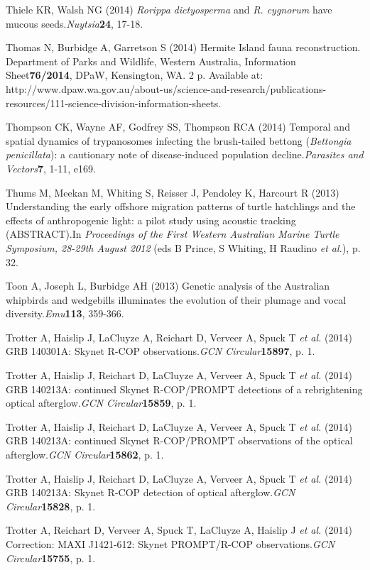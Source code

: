 \documentclass[version=last, paper=a4, DIV=18, usenames, dvipsnames]{scrartcl}
\begin{document}
Thiele KR, Walsh NG (2014) \emph{Rorippa} \emph{dictyosperma} and \emph{R. cygnorum} have mucous seeds.\emph{Nuytsia}\textbf{24}, 17-18.


Thomas N, Burbidge A, Garretson S (2014) Hermite Island fauna reconstruction. Department of Parks and Wildlife, Western Australia, Information Sheet\textbf{76/2014}, DPaW, Kensington, WA. 2 p. Available at: http://www.dpaw.wa.gov.au/about-us/science-and-research/publications-resources/111-science-division-information-sheets.


Thompson CK, Wayne AF, Godfrey SS, Thompson RCA (2014) Temporal and spatial dynamics of trypanosomes infecting the brush-tailed bettong (\emph{Bettongia} \emph{penicillata}): a cautionary note of disease-induced population decline.\emph{Parasites and Vectors}\textbf{7}, 1-11, e169.


Thums M, Meekan M, Whiting S, Reisser J, Pendoley K, Harcourt R (2013) Understanding the early offshore migration patterns of turtle hatchlings and the effects of anthropogenic light: a pilot study using acoustic tracking (ABSTRACT).In \emph{Proceedings of the First Western Australian Marine Turtle Symposium, 28-29th August 2012} (eds B Prince, S Whiting, H Raudino \emph{et al.}), p. 32.


Toon A, Joseph L, Burbidge AH (2013) Genetic analysis of the Australian whipbirds and wedgebills illuminates the evolution of their plumage and vocal diversity.\emph{Emu}\textbf{113}, 359-366.


Trotter A, Haislip J, LaCluyze A, Reichart D, Verveer A, Spuck T \emph{et al.} (2014) GRB 140301A: Skynet R-COP observations.\emph{GCN Circular}\textbf{15897}, p. 1.


Trotter A, Haislip J, Reichart D, LaCluyze A, Verveer A, Spuck T \emph{et al.} (2014) GRB 140213A: continued Skynet R-COP/PROMPT detections of a rebrightening optical afterglow.\emph{GCN Circular}\textbf{15859}, p. 1.


Trotter A, Haislip J, Reichart D, LaCluyze A, Verveer A, Spuck T \emph{et al.} (2014) GRB 140213A: continued Skynet R-COP/PROMPT observations of the optical afterglow.\emph{GCN Circular}\textbf{15862}, p. 1.


Trotter A, Haislip J, Reichart D, LaCluyze A, Verveer A, Spuck T \emph{et al.} (2014) GRB 140213A: Skynet R-COP detection of optical afterglow.\emph{GCN Circular}\textbf{15828}, p. 1.


Trotter A, Reichart D, Verveer A, Spuck T, LaCluyze A, Haislip J \emph{et al.} (2014) Correction: MAXI J1421-612: Skynet PROMPT/R-COP observations.\emph{GCN Circular}\textbf{15755}, p. 1.
\end{document}
